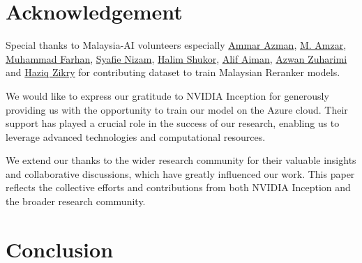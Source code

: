 \documentclass[preprint]{article}
\begin{document}
\section{Acknowledgement}

Special thanks to Malaysia-AI volunteers especially \href{https://www.linkedin.com/in/ammar-azman/}{Ammar Azman}, \href{https://www.linkedin.com/in/amzar96/}{M. Amzar}, \href{https://www.linkedin.com/in/muhammad-farhan-helmy-0529501a7/}{Muhammad Farhan}, \href{https://www.linkedin.com/in/syafie-nizam/}{Syafie Nizam}, \href{https://www.linkedin.com/in/halimshukor/}{Halim Shukor}, \href{https://www.linkedin.com/in/alif-aiman-1b334b24b/}{Alif Aiman}, \href{https://www.linkedin.com/in/azwan-zuharimi/}{Azwan Zuharimi} and \href{https://www.linkedin.com/in/haziqzikry/}{Haziq Zikry} for contributing dataset to train Malaysian Reranker models.

We would like to express our gratitude to NVIDIA Inception for generously providing us with the opportunity to train our model on the Azure cloud. Their support has played a crucial role in the success of our research, enabling us to leverage advanced technologies and computational resources.

We extend our thanks to the wider research community for their valuable insights and collaborative discussions, which have greatly influenced our work. This paper reflects the collective efforts and contributions from both NVIDIA Inception and the broader research community.

\section{Conclusion}

{}

\end{document}
